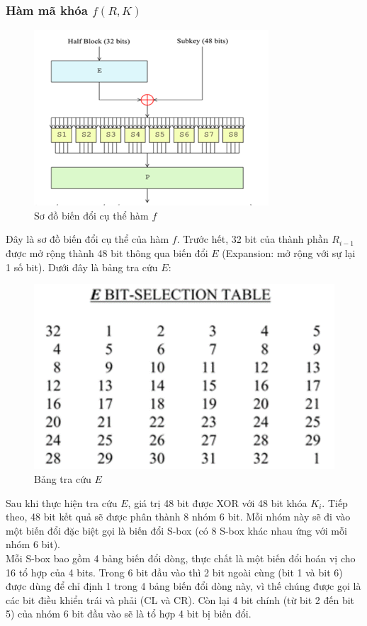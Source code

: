  \subsubsection{Hàm mã khóa $f(R,K)$}
\begin{figure}[H]
	\centering
	\includegraphics[scale=0.6]{"Ảnh/hiền/biến đổi E"}
	\caption{Sơ đồ biến đổi cụ thể hàm $f$}
	\label{fig:bien-oi-e}
\end{figure}
Đây là sơ đồ biến đổi cụ thể của hàm $f$. Trước hết, 32 bit của thành phần $R_{i-1}$ được mở rộng thành 48 bit thông qua biến đổi $E$ (Expansion: mở rộng với sự lại 1 số bit). Dưới đây là bảng tra cứu $E$: 
\begin{figure}[H]
	\centering
	\includegraphics[scale=0.6]{"Ảnh/hiền/tra cứu E"}
	\caption{Bảng tra cứu $E$}
	\label{fig:tra-cuu-e}
\end{figure}
Sau khi thực hiện tra cứu $E$, giá trị 48 bit được XOR với 48 bit khóa $K_i$. Tiếp theo, 48 bit kết quả sẽ được phân thành 8 nhóm 6 bit. Mỗi nhóm này sẽ đi vào một biến đổi đặc biệt gọi là biến đổi S-box (có 8 S-box khác nhau ứng với mỗi nhóm 6 bit). \\
\indent Mỗi S-box bao gồm 4 bảng biến đổi dòng, thực chất là một biến đổi hoán vị cho 16 tổ hợp của 4 bits. Trong 6 bit đầu vào thì 2 bit ngoài cùng (bit 1 và bit 6) được dùng để chỉ định 1 trong 4 bảng biến đổi dòng này, vì thế chúng được gọi là các bit điều khiển trái và phải (CL và CR). Còn lại 4 bit chính (từ bit 2 đến bit 5) của nhóm 6 bit đầu vào sẽ là tổ hợp 4 bit bị biến đổi. \\

